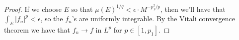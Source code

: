 \documentclass[11pt,letterpaper]{report}
\begin{document}
\begin{enumerate}
\begin{proof}
		If we choose $E$ so that $\mu(E)^{1/q} < \epsilon\cdot M^{-p_1^2/p}$, then we'll have that $\int_E|f_n|^p <\epsilon$, so the $f_n$'s are uniformly integrable. By the Vitali convergence theorem we have that $f_n\to f$ in $L^p$ for $p\in [1, p_1]$.
	\end{proof}


\end{enumerate}
\end{document}
